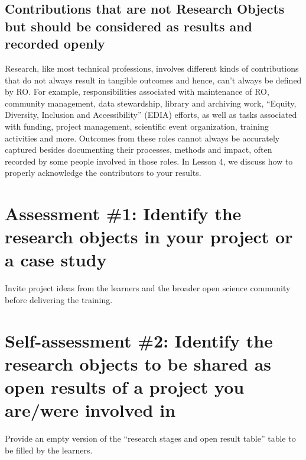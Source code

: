 \documentclass[
  letterpaper,
  DIV=11,
  numbers=noendperiod]{scrreport}
\begin{document}
\hypertarget{contributions-that-are-not-research-objects-but-should-be-considered-as-results-and-recorded-openly}{%
\subsection{Contributions that are not Research Objects but should be
considered as results and recorded
openly}\label{contributions-that-are-not-research-objects-but-should-be-considered-as-results-and-recorded-openly}}

Research, like most technical professions, involves different kinds of
contributions that do not always result in tangible outcomes and hence,
can't always be defined by RO. For example, responsibilities associated
with maintenance of RO, community management, data stewardship, library
and archiving work, ``Equity, Diversity, Inclusion and Accessibility''
(EDIA) efforts, as well as tasks associated with funding, project
management, scientific event organization, training activities and more.
Outcomes from these roles cannot always be accurately captured besides
documenting their processes, methods and impact, often recorded by some
people involved in those roles. In Lesson 4, we discuss how to properly
acknowledge the contributors to your results.

\hypertarget{assessment-1-identify-the-research-objects-in-your-project-or-a-case-study}{%
\section{Assessment \#1: Identify the research objects in your project
or a case
study}\label{assessment-1-identify-the-research-objects-in-your-project-or-a-case-study}}

Invite project ideas from the learners and the broader open science
community before delivering the training.

\hypertarget{self-assessment-2-identify-the-research-objects-to-be-shared-as-open-results-of-a-project-you-arewere-involved-in}{%
\section{Self-assessment \#2: Identify the research objects to be shared
as open results of a project you are/were involved
in}\label{self-assessment-2-identify-the-research-objects-to-be-shared-as-open-results-of-a-project-you-arewere-involved-in}}

Provide an empty version of the ``research stages and open result
table'' table to be filled by the learners.
\end{document}
